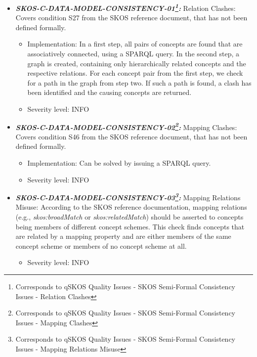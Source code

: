 \documentclass{llncs}
\begin{document}
\begin{itemize}

	\item \textbf{{\em SKOS-C-DATA-MODEL-CONSISTENCY-01\footnote{Corresponds to qSKOS Quality Issues - SKOS Semi-Formal Consistency Issues - Relation Clashes}:}}
	Relation Clashes:
  Covers condition S27 from the SKOS reference document, that has not been defined formally. 
	\begin{itemize}
	  \item Implementation:
		In a first step, all pairs of concepts are found that are associatively connected, using a SPARQL query. In the second step, a graph is created, containing only hierarchically related concepts and the respective relations. For each concept pair from the first step, we check for a path in the graph from step two. If such a path is found, a clash has been identified and the causing concepts are returned. 
		\item Severity level: INFO
	\end{itemize}
	
	\item \textbf{{\em SKOS-C-DATA-MODEL-CONSISTENCY-02\footnote{Corresponds to qSKOS Quality Issues - SKOS Semi-Formal Consistency Issues - Mapping Clashes}:}}
	Mapping Clashes:
  Covers condition S46 from the SKOS reference document, that has not been defined formally. 
	\begin{itemize}
	  \item Implementation:
		Can be solved by issuing a SPARQL query. 
		\item Severity level: INFO
	\end{itemize}
	
	\item \textbf{{\em SKOS-C-DATA-MODEL-CONSISTENCY-03\footnote{Corresponds to qSKOS Quality Issues - SKOS Semi-Formal Consistency Issues - Mapping Relations Misuse}:}}
	Mapping Relations Misuse:
  According to the SKOS reference documentation, mapping relations (e.g., \emph{skos:broadMatch} or \emph{skos:relatedMatch}) should be asserted to concepts being members of different concept schemes. This check finds concepts that are related by a mapping property and are either members of the same concept scheme or members of no concept scheme at all. 
	\begin{itemize}
		\item Severity level: INFO
	\end{itemize}
	
\end{itemize}
\end{document}
